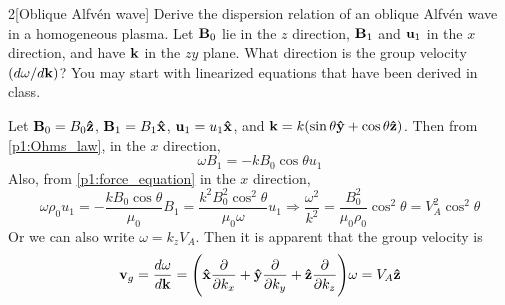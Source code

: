 \documentclass[12pt]{article}
\begin{document}
\begin{problem}{2}[Oblique Alfvén wave]
Derive the dispersion relation of an oblique Alfvén wave in a homogeneous
plasma. Let $\vb{B}_0$ lie in the $z$ direction, $\vb{B}_1$ and $\vb{u}_1$ in
the $x$ direction, and have $\vb{k}$ in the $zy$ plane. What direction is the
group velocity $(d\omega /d\vb{k})$? You may start with linearized equations
that have been derived in class.
\begin{solution}
Let $\vb{B}_0=B_0\vb{\hat{z}}$, $\vb{B}_1=B_1\vb{\hat{x}}$, $\vb{u}_1=u_1\vb{\hat{x}}$, and
$\vb{k}=k(\sin\theta\vb{\hat{y}}+\cos\theta\vb{\hat{z}})$. Then from \eqref{p1:Ohms_law}, in
the $x$ direction,
\begin{equation}
    \omega B_1=-kB_0\cos\theta u_1 
\end{equation}
Also, from \eqref{p1:force_equation} in the $x$ direction,
\begin{equation}
    \omega\rho_0u_1=-\frac{kB_0\cos\theta}{\mu_0}B_1=\frac{k^2B_0^2\cos^2\theta}{\mu_0\omega}u_1
    \Rightarrow
    \frac{\omega^2}{k^2}=\frac{B_0^2}{\mu_0\rho_0}\cos^2\theta=V_A^2\cos^2\theta
\end{equation}
Or we can also write $\omega=k_zV_A$. Then it is apparent that the group
velocity is 
\begin{equation}
    \vb{v}_g=\frac{d\omega}{d\vb{k}}
    =\qty(\vb{\hat{x}}\frac{\partial}{\partial k_x}+\vb{\hat{y}}\frac{\partial}{\partial
    k_y}+\vb{\hat{z}}\frac{\partial}{\partial k_z})\omega
    =V_A\vb{\hat{z}} 
\end{equation}
\end{solution}
\end{problem}
\end{document}

